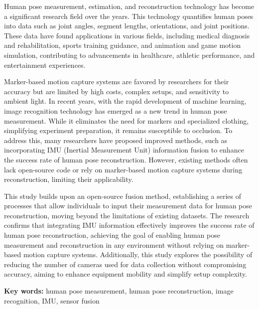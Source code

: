 \begin{abstractEN}

Human pose measurement, estimation, and reconstruction technology has become a significant research field over the years. This technology quantifies human poses into data such as joint angles, segment lengths, orientations, and joint positions. These data have found applications in various fields, including medical diagnosis and rehabilitation, sports training guidance, and animation and game motion simulation, contributing to advancements in healthcare, athletic performance, and entertainment experiences.

Marker-based motion capture systems are favored by researchers for their accuracy but are limited by high costs, complex setups, and sensitivity to ambient light. In recent years, with the rapid development of machine learning, image recognition technology has emerged as a new trend in human pose measurement. While it eliminates the need for markers and specialized clothing, simplifying experiment preparation, it remains susceptible to occlusion. To address this, many researchers have proposed improved methods, such as incorporating IMU (Inertial Measurement Unit) information fusion to enhance the success rate of human pose reconstruction. However, existing methods often lack open-source code or rely on marker-based motion capture systems during reconstruction, limiting their applicability.

This study builds upon an open-source fusion method, establishing a series of processes that allow individuals to input their measurement data for human pose reconstruction, moving beyond the limitations of existing datasets. The research confirms that integrating IMU information effectively improves the success rate of human pose reconstruction, achieving the goal of enabling human pose measurement and reconstruction in any environment without relying on marker-based motion capture systems. Additionally, this study explores the possibility of reducing the number of cameras used for data collection without compromising accuracy, aiming to enhance equipment mobility and simplify setup complexity.

\textbf{Key words:} human pose measurement, human pose reconstruction, image recognition, IMU, sensor fusion
\end{abstractEN}